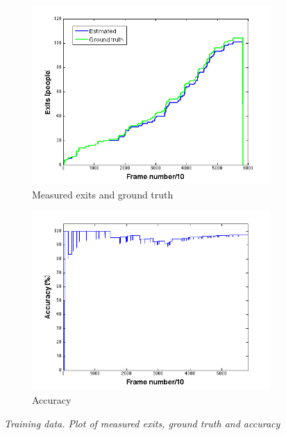 \begin{figure}[H]
\centering
\begin{subfigure}{.5\textwidth}
  \centering
  \includegraphics[width=1.1\linewidth]{images/ExitsTest.png}
  \caption{Measured exits and ground truth}
  \label{fig:sub1}
\end{subfigure}%
\begin{subfigure}{.5\textwidth}
  \centering
  \includegraphics[width=1.1\linewidth]{images/AccExitsTest.png}
  \caption{Accuracy}
  \label{fig:sub2}
\end{subfigure}
\caption[Entries training]{\textit{Training data. Plot of measured exits, ground truth and accuracy}}
\label{fig:Exits Training data}
\end{figure}


